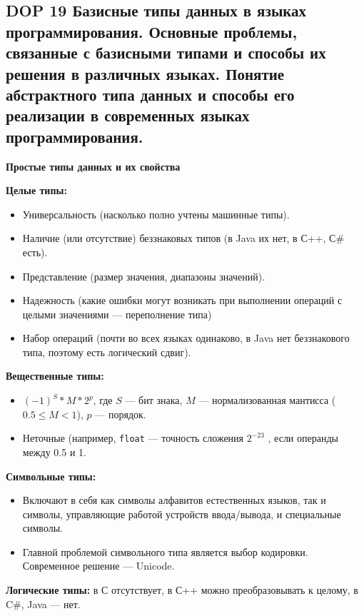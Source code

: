 \subsection{DOP 19 Базисные типы данных в языках программирования. Основные проблемы, связанные с базисными типами и способы их решения в различных языках. Понятие абстрактного типа данных и способы его реализации в современных языках программирования.}

\textbf{Простые типы данных и их свойства}

\textbf{Целые типы:}
\begin{itemize}
    \item Универсальность (насколько полно учтены машинные типы).
    \item Наличие (или отсутствие) беззнаковых типов (в Java их нет, в С++, С\# есть).
    \item Представление (размер значения, диапазоны значений).
    \item Надежность (какие ошибки могут возникать при выполнении операций с целыми значениями --- переполнение типа)
    \item Набор операций (почти во всех языках одинаково, в Java нет беззнакового типа, поэтому есть логический сдвиг).
\end{itemize}

\textbf{Вещественные типы:}
\begin{itemize}
    \item $(-1)^S \ast M \ast 2^p$, где $S$ --- бит знака, $M$ --- нормализованная мантисса ($0.5 \leq M < 1$), $p$ --- порядок.
    \item Неточные (например, \texttt{float} --- точность сложения $2^{-23}$ , если операнды между 0.5 и 1.
\end{itemize}

\textbf{Символьные типы:}
\begin{itemize}
    \item Включают в себя как символы алфавитов естественных языков, так и символы, управляющие работой устройств ввода/вывода, и специальные символы.
    \item Главной проблемой символьного типа является выбор кодировки.
    Современное решение --- Unicode.
\end{itemize}

\textbf{Логические типы:} в С отсутствует, в С++ можно преобразовывать к целому, в C\#, Java --- нет.

